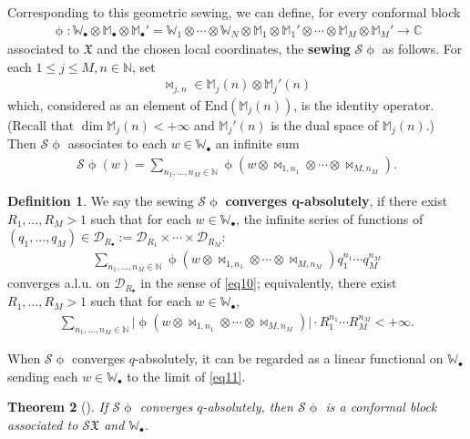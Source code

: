 \documentclass[11pt,b5paper,notitlepage]{article}
\theoremstyle{definition}
\newtheorem{df}{Definition}[subsection]
\theoremstyle{plain}
\newtheorem{thm}[df]{Theorem}
\newcommand{\fk}{\mathfrak}
\newcommand{\mc}{\mathcal}
\newcommand{\End}{\mathrm{End}} %
\newcommand{\scr}{\mathscr}
\newcommand{\bsb}{\boldsymbol}
\newcommand{\blt}{\bullet}
\newcommand{\Wbb}{\mathbb W}
\newcommand{\Mbb}{\mathbb M}
\newcommand{\Cbb}{\mathbb C}
\newcommand{\Nbb}{\mathbb N}
\numberwithin{equation}{subsection}
\begin{document}
Corresponding to this geometric sewing, we can define, for every conformal block
\begin{align*}
\upphi:\Wbb_\blt\otimes\Mbb_\blt\otimes\Mbb_\blt'=\Wbb_1\otimes\cdots\otimes \Wbb_N\otimes\Mbb_1\otimes\Mbb_1'\otimes\cdots\otimes\Mbb_M\otimes\Mbb_M'\rightarrow\Cbb	
\end{align*}
associated to $\fk X$ and the chosen local coordinates, the \textbf{sewing} $\scr S\upphi$ as follows. For each $1\leq j\leq M,n\in\Nbb$, set
\begin{align}
\bowtie_{j,n}\in\Mbb_j(n)\otimes\Mbb_j'(n)	
\end{align}
which, considered as an element of $\End(\Mbb_j(n))$, is the identity operator. (Recall that $\dim\Mbb_j(n)<+\infty$ and $\Mbb_j'(n)$ is the dual space of $\Mbb_j(n)$.) Then $\scr S\upphi$ associates to each $w\in\Wbb_\blt$ an infinite sum
\begin{align}
\scr S\upphi(w)=\sum_{n_1,\dots,n_M\in\Nbb}\upphi(w\otimes \bowtie_{1,n_1}\otimes\cdots\otimes\bowtie_{M,n_M}).	\label{eq11}
\end{align}
\begin{df}\label{lb18}
We say the sewing $\scr S\upphi$ \textbf{converges $\bsb q$-absolutely}, if there exist $R_1,\dots,R_M>1$ such that for each $w\in\Wbb_\blt$, the infinite series of functions of $(q_1,\dots,q_M)\in\mc D_{R_\blt}:=\mc D_{R_1}\times\cdots\times\mc D_{R_M}$:
\begin{align*}
\sum_{n_1,\dots,n_M\in\Nbb}\upphi(w\otimes \bowtie_{1,n_1}\otimes\cdots\otimes\bowtie_{M,n_M})q_1^{n_1}\cdots q_M^{n_M}	
\end{align*}
converges a.l.u. on $\mc D_{R_\blt}$ in the sense of \eqref{eq10}; equivalently, there exist $R_1,\dots,R_M>1$ such that for each $w\in\Wbb_\blt$,
\begin{align*}
\sum_{n_1,\dots,n_M\in\Nbb}\big|\upphi(w\otimes \bowtie_{1,n_1}\otimes\cdots\otimes\bowtie_{M,n_M})\big|\cdot R_1^{n_1}\cdots R_M^{n_M}<+\infty.
\end{align*}
\end{df}

When $\scr S\upphi$ converges $q$-absolutely, it can be regarded as a linear functional on $\Wbb_\blt$ sending each $w\in\Wbb_\blt$ to the limit of \eqref{eq11}.

\begin{thm}[{\cite[Thm. 11.3]{Gui24a}}]\label{lb37}
If $\scr S\upphi$ converges $q$-absolutely, then $\scr S\upphi$ is a conformal block associated to $\scr S\fk X$ and $\Wbb_\blt$.
\end{thm}
\end{document}
